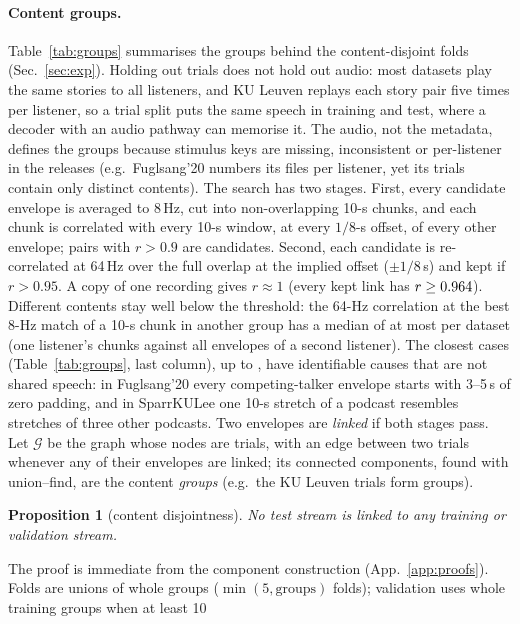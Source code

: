 \documentclass[10pt,twocolumn,letterpaper]{article}
\newtheorem{proposition}{Proposition}
\begin{document}
\paragraph{Content groups.} Table~\ref{tab:groups} summarises the groups behind the
content-disjoint folds (Sec.~\ref{sec:exp}). Holding out trials does not hold out audio: most
datasets play the same stories to all listeners, and KU Leuven replays each story pair five
times per listener, so a trial split puts the same speech in training and test, where a
decoder with an audio pathway can memorise it. The audio, not the metadata, defines the groups
because stimulus keys are missing, inconsistent or per-listener in the releases (e.g.\
Fuglsang'20 numbers its files per listener, yet its \grpFugTrials{} trials contain only
\grpFugGroups{} distinct contents). The search has two stages. First, every candidate
envelope is averaged to 8\,Hz, cut into non-overlapping 10-s chunks, and each chunk is
correlated with every 10-s window, at every $1/8$-s offset, of every other envelope; pairs
with $r>0.9$ are candidates. Second, each candidate is re-correlated at 64\,Hz over the full
overlap at the implied offset ($\pm1/8$\,s) and kept if $r>0.95$. A copy of one recording
gives $r\approx1$ (every kept link has $r\ge0.964$). Different contents stay well below the
threshold: the 64-Hz correlation at the best 8-Hz match of a 10-s chunk in another group has
a median of at most \grpNullMed{} per dataset (one listener's chunks against all envelopes of a second
listener). The closest cases (Table~\ref{tab:groups}, last column), up to \grpNullMax, have
identifiable causes that are not shared speech: in Fuglsang'20 every competing-talker envelope
starts with 3--5\,s of zero padding, and in SparrKULee one 10-s stretch of a podcast
resembles stretches of three other podcasts. Two envelopes are \emph{linked} if both stages pass. Let $\mathcal G$ be the graph whose
nodes are trials, with an edge between two trials whenever any of their envelopes are
linked; its connected components, found with union--find, are the content \emph{groups}
(e.g.\ the \grpKULTrials{} KU Leuven trials form \grpKULGroups{} groups).
\begin{proposition}[content disjointness]\label{prop:split}
No test stream is linked to any training or validation stream.
\end{proposition}
The proof is immediate from the component construction (App.~\ref{app:proofs}). Folds are unions of whole groups
($\min(5,\text{groups})$ folds); validation uses whole training groups when at least 10
\end{document}
